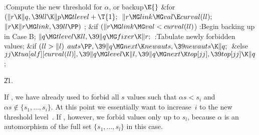 \B{}:Compute the new threshold for $\alpha$, or backup\X${}\E{}$\6
\&{for} ${}(\|r\K\|q,\39\\{ll}\K\|p\MG\\{tlevel}+\T{1};{}$ ${}\|r\MG\\{link}\MG%
\\{val}\E\\{curval}(\\{ll});{}$ ${}\|r\K\|r\MG\\{link},\39\\{ll}\PP){}$\1\5
;\2\6
\&{if} ${}(\|r\MG\\{link}\MG\\{val}<\\{curval}(\\{ll}){}$)\1\6
:Begin backing up in Case B\X;\2\6
${}\|q\MG\\{tlevel}\K\\{ll},\39\|q\MG\\{fixer}\K\|r;{}$\6
:Tabulate newly forbidden values\X;\6
\&{if} ${}(\\{ll}>\|l){}$\1\5
${}\\{auts}\PP,\39\|q\MG\\{next}\K\\{newauts},\39\\{newauts}\K\|q;{}$\2\6
\&{else}\1\5
${}\\{jj}\K\\{tua}[\\{alf}][\\{curval}(\\{ll})],\39\|q\MG\\{level}\K\|l,\39\|q%
\MG\\{next}\K\\{top}[\\{jj}],\39\\{top}[\\{jj}]\K\|q{}$;\2\par
\U21.\fi

If , we have already used  to
forbid all $s$ values
such that $\alpha s<s_i$ and $\alpha s\notin\{s_1,\ldots,s_i\}$.
At this point we essentially want to increase~$i$ to the new threshold
level~. If , however, we forbid values only up to
$s_l$,
because $\alpha$ is an automorphism of the full set $\{s_1,\ldots,s_l\}$
in this case.

